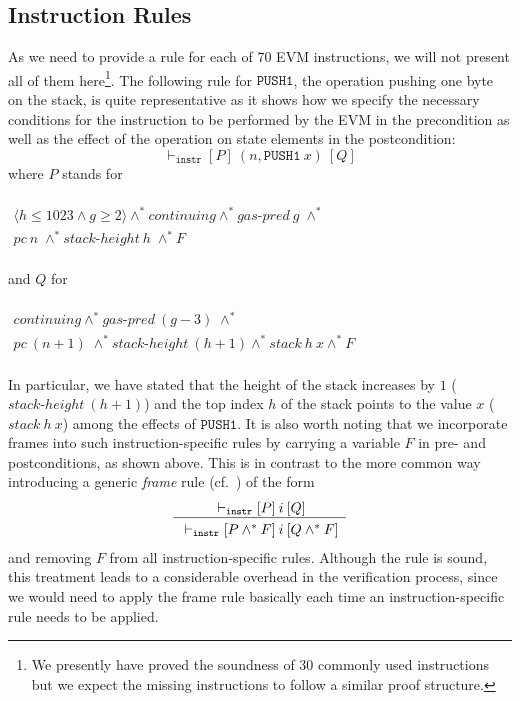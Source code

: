 \documentclass[sigplan,10pt,review]{acmart}\settopmatter{printfolios=true,printccs=false,printacmref=false}
\newcommand{\sconj}{\wedge^*}
\newcommand{\ttrip}[5]{\mathit{#1} \vdash_{\mathrm{#2}}[#3]\:#4\:[#5]}
\newcommand{\cont}{\mathit{continuing}}
\newcommand{\pc}{\mathit{pc}}
\newcommand{\gaspred}{\mathit{gas\mbox{-}pred}}
\newcommand{\stackh}{\mathit{stack\mbox{-}height}}
\newcommand{\stack}{\mathit{stack}}
\newcommand{\instr}[1]{\mathtt{#1}}
\newcommand{\pure}[1]{\langle#1\rangle}
\newcommand{\RuleC}[2]{\begin{array}{c}#1\\\hline\noalign{\smallskip}#2\end{array}}
\begin{document}
\subsection{Instruction Rules}
\label{sec:instr-rules}
As we need to provide a rule for each of 70 EVM instructions, we will not
present all of them here\footnote{We presently have
proved the soundness of 30 commonly used instructions but
we expect the missing instructions to follow a similar proof structure.}.
The following rule for $\instr{PUSH1}$, the operation pushing one byte on the stack, is quite representative
as it shows how we specify the necessary conditions for 
the instruction to be performed by the EVM in the precondition as well as 
the effect of the operation on state elements in the postcondition:
\[
\ttrip{}{\mathtt{instr}}{P}{(n, \instr{PUSH1}\:x)}{Q}
\]
where $P$ stands for 
\\
\\$
\begin{array}{l}
\pure{h \le 1023 \wedge g \geq 2} \sconj \cont \sconj \gaspred\:g \; \sconj \\
\pc\:n \; \sconj \stackh\:h \; \sconj F 
\end{array}
$\\ 
\\
and $Q$ for\\
\\$
\begin{array}{l}
\cont \sconj \gaspred\:(g - 3) \; \sconj \\
\pc\:(n+1) \; \sconj \stackh\:(h + 1) \sconj \stack\:h\:x \sconj F
\end{array}
$\\
\\
In particular, we have stated that the height of the stack increases by $1$ 
($\stackh\:(h + 1)$)
and the top index $h$ of the stack points to the value $x$ ($\stack\:h\:x$)
among the effects of $\instr{PUSH1}$. It is also worth noting that we incorporate frames
into such instruction-specific rules by carrying a variable $F$ in pre- and
postconditions, as shown above. This is in contrast to the more common way
introducing a generic \emph{frame} rule (cf.~\cite{Reynolds_02}) of the form
\[
\RuleC{\ttrip{}{\mathtt{instr}}{P}{i}{Q}}{\ttrip{}{\mathtt{instr}}{P \sconj F}{i}{Q \sconj F}}
\] 
and removing $F$ from all instruction-specific rules. Although the rule is sound, this treatment leads to 
a considerable overhead in the verification process, since we would need to apply
the frame rule basically each time an instruction-specific rule needs to be applied. 
\end{document}
